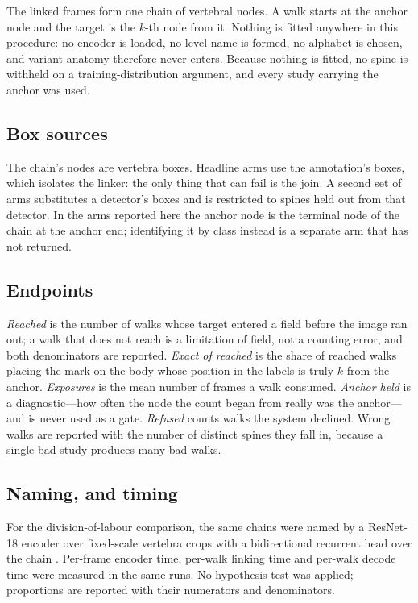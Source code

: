 \documentclass[11pt,letterpaper]{article}
\begin{document}
The linked frames form one chain of vertebral nodes. A walk starts at the anchor node and the target is the
$k$-th node from it. Nothing is fitted anywhere in this procedure: no encoder is loaded, no level name is
formed, no alphabet is chosen, and variant anatomy therefore never enters. Because nothing is fitted, no
spine is withheld on a training-distribution argument, and every study carrying the anchor was used.

\subsection*{Box sources}
The chain's nodes are vertebra boxes. Headline arms use the annotation's boxes, which isolates the linker:
the only thing that can fail is the join. A second set of arms substitutes a detector's boxes and is
restricted to spines held out from that detector. In the arms reported here the anchor node is the terminal
node of the chain at the anchor end; identifying it by class instead is a separate arm that has not
returned.

\subsection*{Endpoints}
\emph{Reached} is the number of walks whose target entered a field before the image ran out; a walk that
does not reach is a limitation of field, not a counting error, and both denominators are reported.
\emph{Exact of reached} is the share of reached walks placing the mark on the body whose position in the
labels is truly $k$ from the anchor. \emph{Exposures} is the mean number of frames a walk consumed.
\emph{Anchor held} is a diagnostic---how often the node the count began from really was the anchor---and is
never used as a gate. \emph{Refused} counts walks the system declined. Wrong walks are reported with the
number of distinct spines they fall in, because a single bad study produces many bad walks.

\subsection*{Naming, and timing}
For the division-of-labour comparison, the same chains were named by a ResNet-18 encoder over fixed-scale
vertebra crops with a bidirectional recurrent head over the chain \citep{he2016,schwing2026mixed}. Per-frame
encoder time, per-walk linking time and per-walk decode time were measured in the same runs. No hypothesis
test was applied; proportions are reported with their numerators and denominators.
\end{document}
